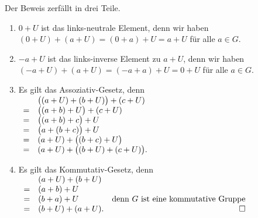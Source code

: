 \proof
Der Beweis zerfällt in drei Teile.
\begin{enumerate}
\item $0 + U$ ist das links-neutrale Element, denn wir haben
      \\[0.2cm]
      \hspace*{1.3cm}
      $(0 + U) + (a + U) = (0 + a) + U = a + U$ \quad für alle $a \in G$.
\item $-a + U$ ist das links-inverse Element zu $a + U$, denn wir haben
      \\[0.2cm]
      \hspace*{1.3cm}
      $(-a + U) + (a + U) = (-a + a) + U = 0 + U$ \quad für alle $a \in G$.
\item Es gilt das Assoziativ-Gesetz, denn
      \\[0.2cm]
      \hspace*{1.3cm}
      $
      \begin{array}[t]{cl}
        & \bigl((a + U) + (b + U)\bigr) + (c + U)   \\
      = & \bigl((a + b) + U\bigr) + (c + U)         \\
      = & \bigl((a + b) + c\bigr) + U               \\
      = & \bigl(a + (b + c)\bigr) + U               \\
      = & (a + U) + \bigl((b + c) + U\bigr)         \\
      = & (a + U) + \bigl((b + U) + (c + U)\bigr).  \\
      \end{array}
      $
\item Es gilt das Kommutativ-Gesetz, denn
      \\[0.2cm]
      \hspace*{1.3cm}
      $
      \begin{array}[t]{cll}
        & (a + U) + (b + U) \\
      = & (a + b) + U       \\
      = & (b + a) + U & \mbox{denn $G$ ist eine kommutative Gruppe} \\
      = & (b + U) + (a + U). & \hspace*{\fill} \Box
      \end{array}
      $
\end{enumerate}
\pagebreak

